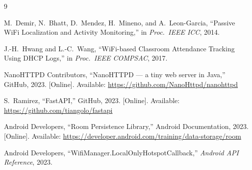 \documentclass[sigconf,nonacm]{acmart}
\begin{document}
\begin{thebibliography}{9}

M.~Demir, N.~Bhatt, D.~Mendez, H.~Mineno, and A.~Leon-Garcia,
``Passive WiFi Localization and Activity Monitoring,''
in \emph{Proc.\ IEEE ICC}, 2014.

J.-H.~Hwang and L.-C.~Wang,
``WiFi-based Classroom Attendance Tracking Using DHCP Logs,''
in \emph{Proc.\ IEEE COMPSAC}, 2017.

NanoHTTPD Contributors,
``NanoHTTPD --- a tiny web server in Java,''
GitHub, 2023. [Online]. Available: \url{https://github.com/NanoHttpd/nanohttpd}

S.~Ramirez,
``FastAPI,''
GitHub, 2023. [Online]. Available: \url{https://github.com/tiangolo/fastapi}

Android Developers,
``Room Persistence Library,''
Android Documentation, 2023. [Online]. Available:
\url{https://developer.android.com/training/data-storage/room}

Android Developers,
``WifiManager.LocalOnlyHotspotCallback,''
\emph{Android API Reference}, 2023.

\end{thebibliography}
\end{document}
